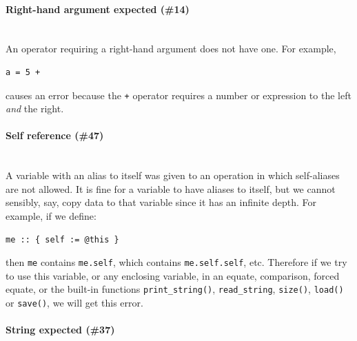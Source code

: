 \documentclass{article}
\newenvironment{code}{
       \begin{list}{}{
               \setlength{\leftmargin}{.4in}
               \setlength{\rightmargin}{0in}
               \setlength{\topsep}{.2in}
       }
       \small
       \item[] }
       { \end{list}   }
\begin{document}
\paragraph{Right-hand argument expected (\#14)\\\\}

An operator requiring a right-hand argument does not have one.  For example,

\begin{code} \begin{verbatim}
a = 5 +
\end{verbatim} \end{code}

\noindent causes an error because the \verb#+# operator requires a number or expression to the left \emph{and} the right.\\




\paragraph{Self reference (\#47)\\\\}

A variable with an alias to itself was given to an operation in which self-aliases are not allowed.  It is fine for a variable to have aliases to itself, but we cannot sensibly, say, copy data to that variable since it has an infinite depth.  For example, if we define:

\begin{code} \begin{verbatim}
me :: { self := @this }
\end{verbatim} \end{code}

\noindent then \verb#me# contains \verb#me.self#, which contains \verb#me.self.self#, etc.  Therefore if we try to use this variable, or any enclosing variable, in an equate, comparison, forced equate, or the built-in functions \verb#print_string()#, \verb#read_string#, \verb#size()#, \verb#load()# or \verb#save()#, we will get this error.\\




\paragraph{String expected (\#37)\\\\}
\end{document}
